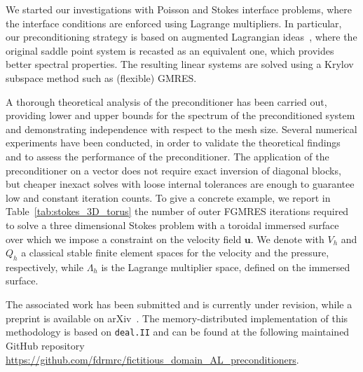 \documentclass[a4paper,12pt]{article}
\begin{document}
We started our investigations with Poisson and Stokes interface problems, where the interface conditions are enforced
using Lagrange multipliers. In particular, our preconditioning strategy is based on augmented Lagrangian ideas~\cite{BenziAL}, where the original saddle point system is recasted
as an equivalent one, which provides better spectral properties. The resulting linear systems are solved using a Krylov subspace method such as (flexible) GMRES.

A thorough theoretical analysis of the preconditioner has been carried out, providing lower and upper bounds for the spectrum of
the preconditioned system and demonstrating independence with respect to the mesh size. Several numerical experiments have been conducted,
in order to validate the theoretical findings and to assess the performance of the preconditioner. The application of the
preconditioner on a vector does not require exact inversion of diagonal blocks, but cheaper inexact solves with loose internal tolerances are enough to guarantee
low and constant iteration counts. To give a concrete example, we report in Table~\ref{tab:stokes_3D_torus} the number of
outer FGMRES iterations required to solve a three dimensional Stokes problem with a toroidal immersed surface over which we impose a constraint on the
velocity field $\mathbf{u}$. We denote with $V_h$ and $Q_h$ a classical stable finite element spaces for the velocity and the pressure, respectively, while
$\Lambda_h$ is the Lagrange multiplier space, defined on the immersed surface.

The associated work has been submitted and is currently under revision, while a preprint is available on
arXiv~\cite{ALprec}. The memory-distributed implementation of this methodology is based on \texttt{deal.II}
and can be found at the following maintained GitHub
repository \url{https://github.com/fdrmrc/fictitious_domain_AL_preconditioners}.



\begin{center}
      \begin{minipage}{\linewidth}
            \centering
            \label{tab:stokes_3D_torus}
      \end{minipage}
\end{center}
\end{document}
